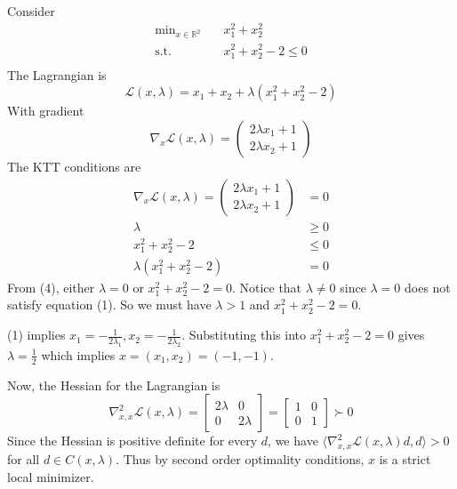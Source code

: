 \begin{example}
    Consider 
    \begin{align*}
        \text{min}_{x \in \mathbb R^2} \quad &x_1^2 + x_2^2 \\
        \text{s.t.} \quad &x_1^2 + x_2^2 - 2\leq 0 \\
    \end{align*}
    The Lagrangian is $$\mathcal L(x, \lambda) = x_1 + x_2 + \lambda(x_1^2 + x_2^2 - 2)$$
    With gradient
    $$\nabla_x \mathcal L(x, \lambda) = \begin{pmatrix}
        2\lambda x_1 + 1 \\
        2\lambda x_2 + 1
    \end{pmatrix} $$
    The KTT conditions are 
    \begin{align*}
        \nabla_x \mathcal L(x, \lambda) = \begin{pmatrix}
            2\lambda x_1 + 1 \\
            2\lambda x_2 + 1
        \end{pmatrix} &= 0 \tag{1}\\
        \lambda &\geq 0 \tag{2}\\
        x_1^2 + x_2^2 - 2 &\leq 0 \tag{3}\\
        \lambda(x_1^2 + x_2^2 - 2) &= 0 \tag{4}
    \end{align*}
    From (4), either $\lambda = 0$ or $x_1^2 + x_2^2 - 2 = 0$. Notice that $\lambda \neq 0$ since $\lambda = 0$ does not satisfy equation (1). So we must have $\lambda > 1$ and $x_1^2 + x_2^2 - 2 = 0$. 
    
    \bigskip 
    (1) implies $x_1 = - \frac{1}{2\lambda_1}, x_2 = - \frac{1}{2\lambda_2}$. Substituting this into $x_1^2 + x_2^2 - 2 = 0$ gives $\lambda = \frac{1}{2}$ which implies $x = (x_1,x_2) = (-1,-1)$. 

    \bigskip
    Now, the Hessian for the Lagrangian is $$\nabla^2_{x, x} \mathcal L(x, \lambda) = \begin{bmatrix}
        2\lambda & 0 \\
        0 & 2\lambda
    \end{bmatrix} = \begin{bmatrix}
        1 & 0 \\
        0 & 1
    \end{bmatrix} \succ 0$$
    Since the Hessian is positive definite for every $d$, we have $\langle \nabla^2_{x, x} \mathcal L(x, \lambda)d, d \rangle > 0$ for all $d \in C(x, \lambda)$. Thus by second order optimality conditions, $x$ is a strict local minimizer.
\end{example}